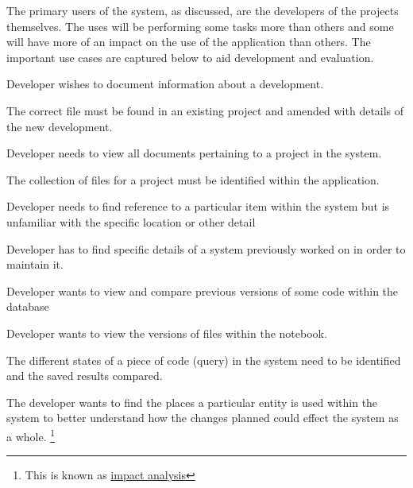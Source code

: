 The primary users of the system, as discussed, are the developers of the projects
themselves. The uses will be performing some tasks more than others and some
will have more of an impact on the use of the application than others. The
important use cases are captured below to aid development and evaluation.

\begin{usecase}

Developer wishes to document information about a development.

The correct file must be found in an existing project and amended with details
of the new development.
\end{usecase}
\begin{usecase}

Developer needs to view all documents pertaining to a project in the
system.

The collection of files for a project must be identified within the
application.
\end{usecase}
\begin{usecase}

Developer needs to find reference to a particular item within the system
but is unfamiliar with the specific location or other detail

\end{usecase}
\begin{usecase}

Developer has to find specific details of a system previously worked on
in order to maintain it.

\end{usecase}
\begin{usecase}

Developer wants to view and compare previous versions of some code
within the database

\end{usecase}
\begin{usecase}

Developer wants to view the versions of files within the notebook.

The different states of a piece of code (query) in the system need to be identified and the saved results compared.

\end{usecase}
\begin{usecase}

The developer wants to find the places a particular entity is used
within the system to better understand how the changes planned could
effect the system as a whole. \footnote{%
  This is known as %
  \href{https://en.wikipedia.org/wiki/Change\_impact\_analysis}{impact
analysis}%
}

\end{usecase}

